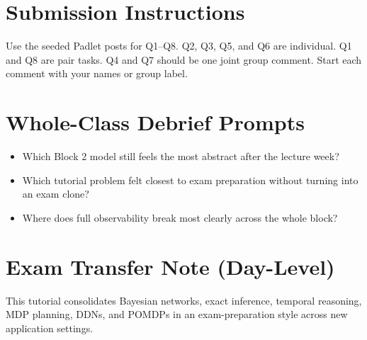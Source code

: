\documentclass[11pt]{article}
\providecommand{\tightlist}{\setlength{\itemsep}{0pt}\setlength{\parskip}{0pt}}
\begin{document}
\section*{Submission Instructions}

Use the seeded Padlet posts for Q1--Q8. Q2, Q3, Q5, and Q6 are individual. Q1 and Q8 are pair tasks. Q4 and Q7 should be one joint group comment. Start each comment with your names or group label.

\section*{Whole-Class Debrief Prompts}

\begin{itemize}
\tightlist
\item
  Which Block 2 model still feels the most abstract after the lecture week?
\item
  Which tutorial problem felt closest to exam preparation without turning into an exam clone?
\item
  Where does full observability break most clearly across the whole block?
\end{itemize}

\section*{Exam Transfer Note (Day-Level)}

This tutorial consolidates Bayesian networks, exact inference, temporal reasoning, MDP planning, DDNs, and POMDPs in an exam-preparation style across new application settings.
\end{document}
